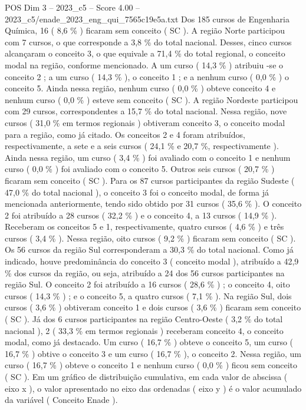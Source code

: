 \begin{textsample}{POS Dim 3 – 2023\_c5 – Score 4.00 – 2023\_c5/enade\_2023\_eng\_qui\_7565c19e5a.txt}
Dos 185 cursos de Engenharia Química, 16 ( 8,6 \% ) ficaram sem conceito ( SC ).
A região Norte participou com 7 cursos, o que corresponde a 3,8 \% do total nacional.
Desses, cinco cursos alcançaram o conceito 3, o que equivale a 71,4 \% do total regional, o conceito modal na região, conforme mencionado.
A um curso ( 14,3 \% ) atribuiu -se o conceito 2 ; a um curso ( 14,3 \% ), o conceito 1 ; e a nenhum curso ( 0,0 \% ) o conceito 5.
Ainda nessa região, nenhum curso ( 0,0 \% ) obteve conceito 4 e nenhum curso ( 0,0 \% ) esteve sem conceito ( SC ).
A região Nordeste participou com 29 cursos, correspondentes a 15,7 \% do total nacional.
Nessa região, nove cursos ( 31,0 \% em termos regionais ) obtiveram conceito 3, o conceito modal para a região, como já citado.
Os conceitos 2 e 4 foram atribuídos, respectivamente, a sete e a seis cursos ( 24,1 \% e 20,7 \%, respectivamente ).
Ainda nessa região, um curso ( 3,4 \% ) foi avaliado com o conceito 1 e nenhum curso ( 0,0 \% ) foi avaliado com o conceito 5.
Outros seis cursos ( 20,7 \% ) ficaram sem conceito ( SC ).
Para os 87 cursos participantes da região Sudeste ( 47,0 \% do total nacional ), o conceito 3 foi o conceito modal, de forma já mencionada anteriormente, tendo sido obtido por 31 cursos ( 35,6 \% ).
O conceito 2 foi atribuído a 28 cursos ( 32,2 \% ) e o conceito 4, a 13 cursos ( 14,9 \% ).
Receberam os conceitos 5 e 1, respectivamente, quatro cursos ( 4,6 \% ) e três cursos ( 3,4 \% ).
Nessa região, oito cursos ( 9,2 \% ) ficaram sem conceito ( SC ).
Os 56 cursos da região Sul corresponderam a 30,3 \% do total nacional.
Como já indicado, houve predominância do conceito 3 ( conceito modal ), atribuído a 42,9 \% dos cursos da região, ou seja, atribuído a 24 dos 56 cursos participantes na região Sul.
O conceito 2 foi atribuído a 16 cursos ( 28,6 \% ) ; o conceito 4, oito cursos ( 14,3 \% ) ; e o conceito 5, a quatro cursos ( 7,1 \% ).
Na região Sul, dois cursos ( 3,6 \% ) obtiveram conceito 1 e dois cursos ( 3,6 \% ) ficaram sem conceito ( SC ).
Já dos 6 cursos participantes na região Centro-Oeste ( 3,2 \% do total nacional ), 2 ( 33,3 \% em termos regionais ) receberam conceito 4, o conceito modal, como já destacado.
Um curso ( 16,7 \% ) obteve o conceito 5, um curso ( 16,7 \% ) obtive o conceito 3 e um curso ( 16,7 \% ), o conceito 2.
Nessa região, um curso ( 16,7 \% ) obteve o conceito 1 e nenhum curso ( 0,0 \% ) ficou sem conceito ( SC ).
Em um gráfico de distribuição cumulativa, em cada valor de abscissa ( eixo x ), o valor apresentado no eixo das ordenadas ( eixo y ) é o valor acumulado da variável ( Conceito Enade ).

\end{textsample}
